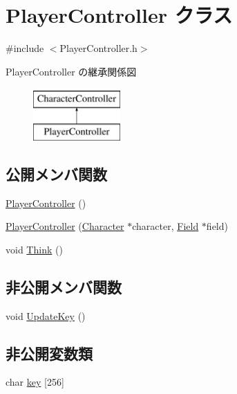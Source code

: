 \hypertarget{class_player_controller}{\section{Player\+Controller クラス}
\label{class_player_controller}
}


{\ttfamily \#include $<$Player\+Controller.\+h$>$}

Player\+Controller の継承関係図\begin{figure}[H]
\begin{center}
\leavevmode
\includegraphics[height=2.000000cm]{class_player_controller}
\end{center}
\end{figure}
\subsection*{公開メンバ関数}
\begin{DoxyCompactItemize}
\item 
\hyperlink{class_player_controller_af2d4e93f407c9cd40a5de9f14cbeadec}{Player\+Controller} ()
\item 
\hyperlink{class_player_controller_a8becc11a59c07bf97ddac1a81771837b}{Player\+Controller} (\hyperlink{class_character}{Character} $\ast$character, \hyperlink{class_field}{Field} $\ast$field)
\item 
void \hyperlink{class_player_controller_a3331f219d6f6a735c1e6cda5e8abb298}{Think} ()
\end{DoxyCompactItemize}
\subsection*{非公開メンバ関数}
\begin{DoxyCompactItemize}
\item 
void \hyperlink{class_player_controller_ac0a4cf90b4d133b4279633fb6c692979}{Update\+Key} ()
\end{DoxyCompactItemize}
\subsection*{非公開変数類}
\begin{DoxyCompactItemize}
\item 
char \hyperlink{class_player_controller_adc832677d282a6a701478e1eada10053}{key} \mbox{[}256\mbox{]}
\end{DoxyCompactItemize}
